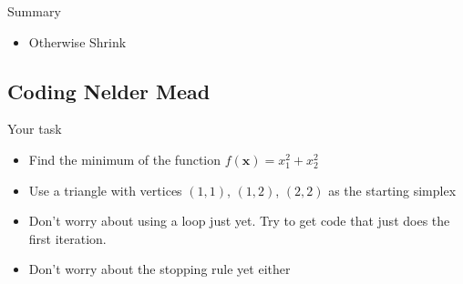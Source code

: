 \documentclass[10pt]{beamer}
\begin{document}
\begin{frame}{Summary}
\begin{itemize}
\begin{enumerate}
\begin{itemize}
                                                                                                    \item Otherwise Shrink
                                                                                                    \end{itemize}
                                                                                                  \end{enumerate}
                                                                                                \end{itemize}
                                                                                              \end{frame}
                                                                                              \subsection{Coding Nelder Mead}
                                                                                              \begin{frame}{Your task}
                                                                                                \begin{itemize}
                                                                                                \item Find the minimum of the function $f({\bm x})=x_1^2+x_2^2$

                                                                                                \item Use a triangle with vertices $(1,1)$, $(1,2)$, $(2,2)$ as the starting simplex

                                                                                                \item Don't worry about using a loop just yet.  Try to get code that just does the first iteration.

                                                                                                \item Don't worry about the stopping rule yet either
                                                                                                \end{itemize}
                                                                                              \end{frame}
\end{document}
